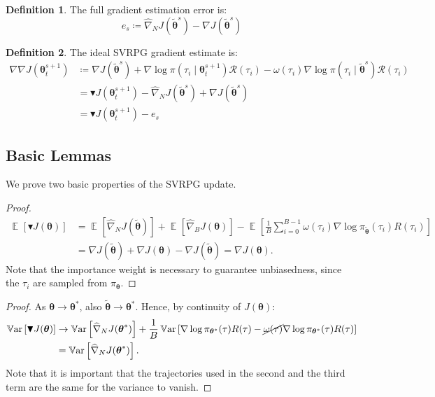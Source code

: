 \documentclass{article}
\theoremstyle{remark}
\theoremstyle{definition}
\newtheorem{definition}{Definition}[section]
\DeclareMathOperator*{\EV}{\mathbb{E}}
\DeclareMathOperator*{\Var}{\mathbb{V}ar}
\newcommand{\EVV}[2][\ppvect \in \ppspace]{\EV_{#1}\left[{#2}\right]}
\newcommand{\dnabla}{\nabla\!\!\!\!\nabla}
\newcommand{\vtheta}{\boldsymbol{\theta}}
\newcommand{\Reward}{\mathcal{R}}
\newcommand{\score}[2]{\nabla\log\pi_{#1}(#2)}
\newcommand{\gradJ}[1]{\nabla J(#1)}
\newcommand{\gradApp}[2]{\widehat{\nabla}_{#2}J(#1)}
\newcommand{\gradBlack}[1]{\blacktriangledown J(#1)}
\newcommand{\gradIdeal}[1]{\dnabla J(#1)}
\begin{document}
\begin{definition}
The full gradient estimation error is:
\[
	e_s \coloneqq \gradApp{\tilde{\vtheta}^s}{N} - \gradJ{\tilde{\vtheta}^s} 
\]
\end{definition}

\begin{definition}\label{def:ideal}
The ideal SVRPG gradient estimate is:
\begin{align*}
	\gradIdeal{\vtheta_t^{s+1}} &\coloneqq 
	\gradJ{\tilde{\vtheta}^s}
	+ \nabla\log\pi(\tau_i \mid \vtheta_t^{s+1})\Reward(\tau_i) 
	- \omega(\tau_i)\nabla\log\pi(\tau_i \mid \tilde{\vtheta}^s)\Reward(\tau_i) \\
	&= \gradBlack{\vtheta_t^{s+1}} - \gradApp{\tilde{\vtheta}^s}{N} + \gradJ{\tilde{\vtheta}^s} \\
	&= \gradBlack{\vtheta_t^{s+1}} - e_s
\end{align*}
\end{definition}


\subsection*{Basic Lemmas}
We prove two basic properties of the SVRPG update.

\unbias*
\begin{proof}
\begin{align*}
\EVV[]{\gradBlack{\vtheta}} &= \EVV[]{\gradApp{\tilde{\vtheta}}{N}}  + \EVV[]{\gradApp{\vtheta}{B}} - \EVV[]{\frac{1}{B}\sum_{i=0}^{B-1}\omega(\tau_i)\score{\tilde{\vtheta}}{\tau_i}R(\tau_i)} \\
&= \gradJ{\tilde{\vtheta}} + \gradJ{\vtheta} - \gradJ{\tilde{\vtheta}} = \gradJ{\vtheta}.
\end{align*}
Note that the importance weight is necessary to guarantee unbiasedness, since the $\tau_i$ are sampled from $\pi_{\vtheta}$.
\end{proof}

\zerovar*
\begin{proof}
As $\vtheta\to\vtheta^*$, also $\tilde{\vtheta}\to\vtheta^*$. Hence, by continuity of $J(\vtheta)$:
\begin{align*}
\Var\left[\gradBlack{\vtheta}\right] &\to \Var\left[\gradApp{\vtheta^*}{N}\right] + \frac{1}{B}\Var\left[\score{\vtheta^*}{\tau}R(\tau) - \cancel{\omega(\tau)}\score{\vtheta^*}{\tau}R(\tau)\right] \\
&= \Var\left[\gradApp{\vtheta^*}{N}\right].
\end{align*}
Note that it is important that the trajectories used in the second and the third term are the same for the variance to vanish.
\end{proof}
\end{document}

